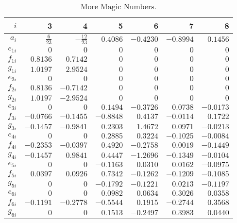 \documentclass[12pt]{article}
\begin{document}
\begin{itemize}
\begin{itemize}
\begin{table}[htb]
\caption[]{More Magic Numbers.
\label{tab:akhNLO}}
\begin{center}
\begin{tabular}{|r|r|r|r|r|r|r|}
\hline
$i$ & 3 & 4 & 5 & 6 & 7 & 8 \\
\hline
$a_i $& $ \frac{6}{23} $&$
-\frac{12}{23} $&$
0.4086 $&$ -0.4230 $&$ -0.8994 $&$ 0.1456 $\\
$e_{1i} $&$ 0 $&$ 0 $&$
0 $&$ 0 $&$ 0 $&$ 0 $\\
$f_{1i} $&$ 0.8136 $&$ 0.7142 $&$
0 $&$ 0 $&$ 0 $&$ 0 $\\
$g_{1i} $&$ 1.0197 $&$ 2.9524 $&$
0 $&$ 0 $&$ 0 $&$ 0 $\\
\hline
$e_{2i} $&$ 0 $&$ 0 $&$
0 $&$ 0 $&$ 0 $&$ 0 $\\
$f_{2i} $&$ 0.8136 $&$ - 0.7142 $&$
0 $&$ 0 $&$ 0 $&$ 0 $\\
$g_{2i} $&$ 1.0197 $&$ - 2.9524 $&$
0 $&$ 0 $&$ 0 $&$ 0 $\\
\hline
$e_{3i} $&$ 0 $&$ 0 $&$
0.1494 $&$ -0.3726 $&$ 0.0738 $&$ -0.0173 $\\
$f_{3i} $&$ -0.0766 $&$ - 0.1455 $&$
-0.8848 $&$ 0.4137 $&$ -0.0114 $&$ 0.1722 $\\
$g_{3i} $&$ -0.1457 $&$ - 0.9841 $&$
0.2303 $&$ 1.4672 $&$ 0.0971 $&$ -0.0213 $\\
\hline
$e_{4i} $&$ 0 $&$ 0 $&$
0.2885 $&$ 0.3224 $&$ -0.1025 $&$ -0.0084 $\\
$f_{4i} $&$ -0.2353 $&$ - 0.0397 $&$
0.4920 $&$ -0.2758 $&$ 0.0019 $&$-0.1449 $\\
$g_{4i} $&$ -0.1457 $&$ 0.9841 $&$
0.4447 $&$ -1.2696 $&$ -0.1349 $&$ -0.0104 $\\
\hline
$e_{5i} $&$ 0 $&$ 0 $&$
-0.1163 $&$ 0.0310 $&$ 0.0162 $&$ -0.0975 $\\
$f_{5i} $&$ 0.0397 $&$  0.0926 $&$
0.7342 $&$ -0.1262 $&$ -0.1209 $&$ -0.1085 $\\
$g_{5i} $&$ 0 $&$ 0 $&$
-0.1792 $&$ -0.1221 $&$ 0.0213 $&$ -0.1197 $\\
\hline
$e_{6i} $&$ 0 $&$ 0 $&$
0.0982 $&$ 0.0634 $&$ 0.3026 $&$ 0.0358 $\\
$f_{6i} $&$ -0.1191 $&$ - 0.2778 $&$
-0.5544 $&$ 0.1915 $&$ -0.2744 $&$ 0.3568 $\\
$g_{6i} $&$ 0 $&$ 0 $&$
0.1513 $&$ -0.2497 $&$ 0.3983 $&$ 0.0440 $\\
\hline
\end{tabular}
\end{center}
\end{table}


\end{itemize}
\end{itemize}
\end{document}
